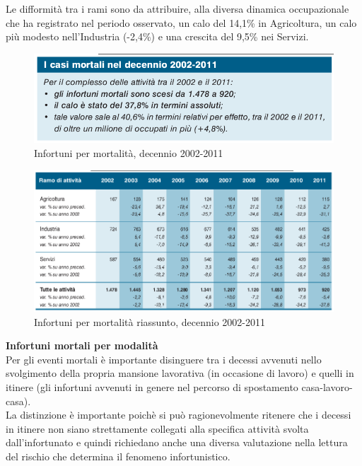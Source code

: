 Le difformità tra i rami sono da attribuire, alla diversa dinamica occupazionale che ha registrato nel periodo osservato, un calo del 14,1\% in Agricoltura, un calo più modesto nell'Industria (-2,4\%) e una crescita del 9,5\% nei Servizi.



\begin{figure}[H]
\centering
\includegraphics[scale=0.5]{images/cap4/analisiDiMercato/infortuniDecennioPerMortalita1}
\caption{Infortuni per mortalità, decennio 2002-2011}
\end{figure}

\begin{figure}[H]
\centering
\includegraphics[scale=0.55]{images/cap4/analisiDiMercato/infortuniDecennioPerMortalita2}
\caption{Infortuni per mortalità riassunto, decennio 2002-2011}
\end{figure}





\textbf{Infortuni mortali per modalità}\\
Per gli eventi mortali è importante disinguere tra i decessi avvenuti nello svolgimento della propria mansione lavorativa (in occasione di lavoro) e quelli in itinere (gli infortuni avvenuti in genere nel percorso di spostamento casa-lavoro-casa).\\
La distinzione è importante poichè si può ragionevolmente ritenere che i decessi in itinere non siano strettamente collegati alla specifica attività svolta dall'infortunato e quindi richiedano anche una diversa valutazione nella lettura del rischio che determina il
fenomeno infortunistico.



